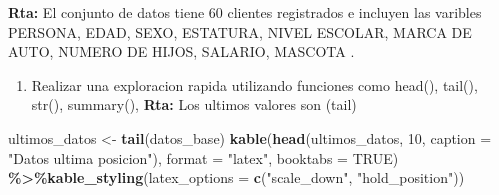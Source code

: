 \documentclass[
]{article}
\newenvironment{Shaded}{\begin{snugshade}}{\end{snugshade}}
\newcommand{\AttributeTok}[1]{\textcolor[rgb]{0.13,0.29,0.53}{#1}}
\newcommand{\ConstantTok}[1]{\textcolor[rgb]{0.56,0.35,0.01}{#1}}
\newcommand{\DecValTok}[1]{\textcolor[rgb]{0.00,0.00,0.81}{#1}}
\newcommand{\FunctionTok}[1]{\textcolor[rgb]{0.13,0.29,0.53}{\textbf{#1}}}
\newcommand{\NormalTok}[1]{#1}
\newcommand{\OtherTok}[1]{\textcolor[rgb]{0.56,0.35,0.01}{#1}}
\newcommand{\SpecialCharTok}[1]{\textcolor[rgb]{0.81,0.36,0.00}{\textbf{#1}}}
\newcommand{\StringTok}[1]{\textcolor[rgb]{0.31,0.60,0.02}{#1}}
\providecommand{\tightlist}{%
  \setlength{\itemsep}{0pt}\setlength{\parskip}{0pt}}
\begin{document}
\textbf{Rta:} El conjunto de datos tiene 60 clientes registrados e
incluyen las varibles PERSONA, EDAD, SEXO, ESTATURA, NIVEL ESCOLAR,
MARCA DE AUTO, NUMERO DE HIJOS, SALARIO, MASCOTA .

\begin{enumerate}
\def\labelenumi{\alph{enumi}.}
\setcounter{enumi}{3}
\tightlist
\item
  Realizar una exploracion rapida utilizando funciones como head(),
  tail(), str(), summary(), \textbf{Rta:} Los ultimos valores son (tail)
\end{enumerate}

\begin{Shaded}
\begin{Highlighting}[]
\NormalTok{ultimos\_datos }\OtherTok{\textless{}{-}} \FunctionTok{tail}\NormalTok{(datos\_base)}
\FunctionTok{kable}\NormalTok{(}\FunctionTok{head}\NormalTok{(ultimos\_datos, }\DecValTok{10}\NormalTok{, }\AttributeTok{caption =} \StringTok{"Datos ultima posicion"}\NormalTok{), }\AttributeTok{format =} \StringTok{"latex"}\NormalTok{, }\AttributeTok{booktabs =} \ConstantTok{TRUE}\NormalTok{) }\SpecialCharTok{\%\textgreater{}\%}\FunctionTok{kable\_styling}\NormalTok{(}\AttributeTok{latex\_options =} \FunctionTok{c}\NormalTok{(}\StringTok{"scale\_down"}\NormalTok{, }\StringTok{"hold\_position"}\NormalTok{))}
\end{Highlighting}
\end{Shaded}

\begin{table}[!h]
\centering
{}
\end{table}
\end{document}

